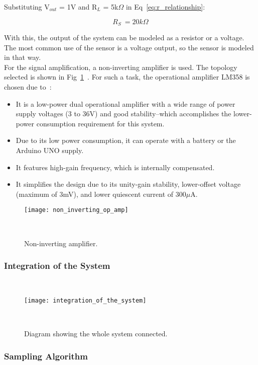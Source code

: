 Substituting V$_{out}$ = 1V and R$_{L}$ = 5k$\Omega$ in Eq~\ref{eq:r_relationship}:

\begin{equation}
    R_{S} ~= 20k\Omega
    \label{eq:rs_at_1v}
\end{equation}

With this, the output of the system can be modeled as a resistor or a voltage. The most common use of the sensor is a voltage output, so the sensor is modeled in that way. \\

For the signal amplification, a non-inverting amplifier is used. The topology selected is shown in Fig~\ref{fig:non_inverting_op_amp}~\cite{svoboda_2013}. For such a task, the operational amplifier LM358 is chosen due to~\cite{lm358_datasheet}:

\begin{itemize}
    \item It is a low-power dual operational amplifier with a wide range of power supply voltages (3 to 36V) and good stability--which accomplishes the lower-power consumption requirement for this system.

    \item Due to its low power consumption, it can operate with a battery or the Arduino UNO supply.

    \item It features high-gain frequency, which is internally compensated.

    \item It simplifies the design due to its unity-gain stability, lower-offset voltage (maximum of 3mV), and lower quiescent current of 300$\mu$A.
\end{itemize}



\begin{figure}[H]
    \centering
    \texttt{[image: non\_inverting\_op\_amp]}
    \caption{Non-inverting amplifier.}
~\label{fig:non_inverting_op_amp}
\end{figure}


\subsubsection{Integration of the System}
~\label{sec:methodology:dev_methodology:iots}
\hspace{8pt}


\begin{figure}[H]
    \centering
    \texttt{[image: integration\_of\_the\_system]}
    \caption{Diagram showing the whole system connected.}
~\label{fig:integration_of_the_system}
\end{figure}


\subsubsection{Sampling Algorithm}
~\label{sec:methodology:dev_methodology:sa}
\hspace{8pt}


